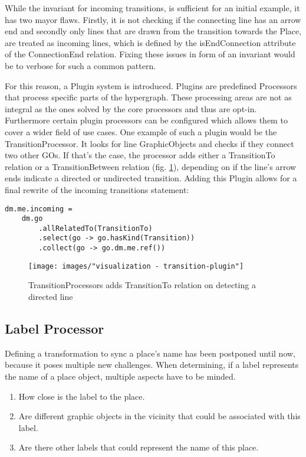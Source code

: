 While the invariant for incoming transitions, is sufficient for an initial example, it has two mayor flaws. Firstly, it is not checking if the connecting line has an arrow end and secondly only lines that are drawn from the transition towards the Place, are treated as incoming lines, which is defined by the isEndConnection attribute of the ConnectionEnd relation. Fixing these issues in form of an invariant would be to verbose for such a common pattern.

For this reason, a Plugin system is introduced. Plugins are predefined Processors that process specific parts of the hypergraph. These processing areas are not as integral as the ones solved by the core processors and thus are opt-in. Furthermore certain plugin processors can be configured which allows them to cover a wider field of use cases. One example of such a plugin would be the TransitionProcessor. It looks for line GraphicObjects and checks if they connect two other GOs. If that's the case, the processor adds either a TransitionTo relation or a TransitionBetween relation (fig. \ref{fig:transition-plugin}), depending on if the line's arrow ends indicate a directed or undirected transition. Adding this Plugin allows for a final rewrite of the incoming transitions statement:

\begin{lstlisting}[language=OCL]
dm.me.incoming = 
    dm.go
        .allRelatedTo(TransitionTo)
        .select(go -> go.hasKind(Transition))
        .collect(go -> go.dm.me.ref())
\end{lstlisting}

\begin{figure}[ht]
\centering
\texttt{[image: images/"visualization - transition-plugin"]}
\caption{TransitionProcessors adds TransitionTo relation on detecting a directed line}
\label{fig:transition-plugin}
\end{figure}



\subsection{Label Processor}

Defining a transformation to sync a place's name has been postponed until now, because it poses multiple new challenges. When determining, if a label represents the name of a place object, multiple aspects have to be minded. 
\begin{enumerate}
  \item How close is the label to the place.
  \item Are different graphic objects in the vicinity that could be associated with this label.
  \item Are there other labels that could represent the name of this place.
\end{enumerate}

